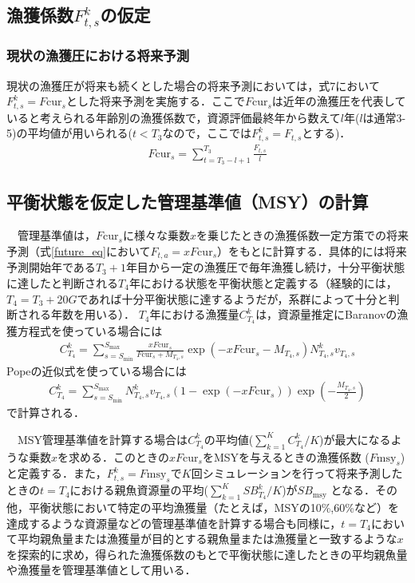\documentclass[11pt]{jsarticle}
\begin{document}
\subsection{漁獲係数$F_{t,s}^k$の仮定}
\subsubsection{現状の漁獲圧における将来予測}
現状の漁獲圧が将来も続くとした場合の将来予測においては，式7において$F_{t,s}^k=F\mathrm{cur}_s$とした将来予測を実施する．ここで$F\mathrm{cur}_s$は近年の漁獲圧を代表していると考えられる年齢別の漁獲係数で，資源評価最終年から数えて$l$年($l$は通常3-5)の平均値が用いられる($t<T_3$なので，ここでは$F_{t,s}^k=F_{t,s}$とする)．
\begin{eqnarray}
  F\mathrm{cur}_s = \sum_{t=T_3-l+1}^{T_3}\frac{F_{t,s}}{l}
\end{eqnarray}

\subsection{平衡状態を仮定した管理基準値（MSY）の計算}
　管理基準値は，$F\mathrm{cur}_s$に様々な乗数$x$を乗じたときの漁獲係数一定方策での将来予測（式\ref{future_eq}において$F_{t,a}=x F\mathrm{cur}_s$）をもとに計算する．具体的には将来予測開始年である$T_3+1$年目から一定の漁獲圧で毎年漁獲し続け，十分平衡状態に達したと判断される$T_4$年における状態を平衡状態と定義する（経験的には，$T_4=T_3+20G$であれば十分平衡状態に達するようだが，系群によって十分と判断される年数を用いる）． $T_4$年における漁獲量$C_{T_4}^k$は，資源量推定にBaranovの漁獲方程式を使っている場合には
\begin{eqnarray}
  C_{T_4}^k=\sum_{s=S_{\mathrm{min}}}^{S_{\mathrm{max}}} \frac{x F\mathrm{cur}_s}{F\mathrm{cur}_s+M_{T_4,s}}
  \exp(-x F\mathrm{cur}_s-M_{T_4,s}) N_{T_4,s}^k v_{T_4,s}
\end{eqnarray}
Popeの近似式を使っている場合には
\begin{eqnarray}
  C_{T_4}^k=\sum_{s=S_{\mathrm{min}}}^{S_{\mathrm{max}}} N_{T_4,s}^k v_{T_4,s} (1-\exp(-x F\mathrm{cur}_s)) \exp(-\frac{M_{T_4, s}}{2})
\end{eqnarray}
で計算される．

　MSY管理基準値を計算する場合は$C_{T_4}^k$の平均値($\sum_{k=1}^K C_{T_4}^k / K$)が最大になるような乗数$x$を求める．このときの$x F\mathrm{cur}_s$をMSYを与えるときの漁獲係数 ($F\mathrm{msy}_s$)と定義する．また，$F_{t,s}^k=F\mathrm{msy}_s$で$K$回シミュレーションを行って将来予測したときの$t=T_4$における親魚資源量の平均($\sum_{k=1}^K SB_{T_4}^k /K$)が$SB_\mathrm{msy}$ となる．その他，平衡状態において特定の平均漁獲量（たとえば，MSYの10\%,60\%など）を達成するような資源量などの管理基準値を計算する場合も同様に，$t=T_4$において平均親魚量または漁獲量が目的とする親魚量または漁獲量と一致するような$x$を探索的に求め，得られた漁獲係数のもとで平衡状態に達したときの平均親魚量や漁獲量を管理基準値として用いる．
\end{document}
